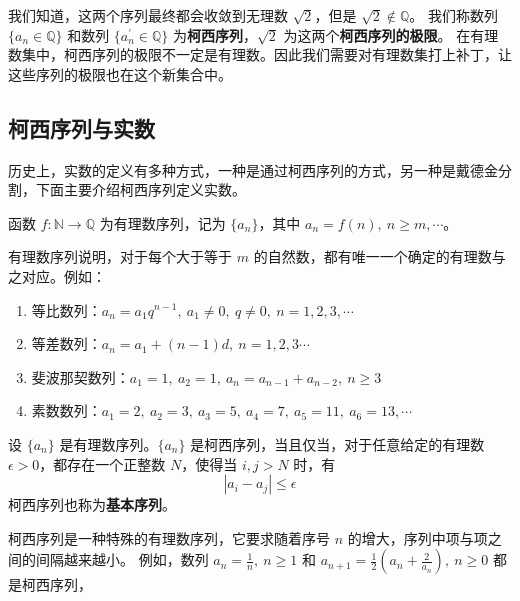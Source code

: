 \begin{note}
    我们知道，这两个序列最终都会收敛到无理数 $ \sqrt{2} $，但是 $ \sqrt{2}\notin\mathbb{Q} $。
    我们称数列 $ \{a_n\in\mathbb{Q}\} $ 和数列 $ \{a_n^{\prime}\in\mathbb{Q}\} $ 为\textbf{柯西序列}，$ \sqrt{2} $ 为这两个\textbf{柯西序列的极限}。
    在有理数集中，柯西序列的极限不一定是有理数。因此我们需要对有理数集打上补丁，让这些序列的极限也在这个新集合中。
\end{note}
\vspace{1em}

\subsection{柯西序列与实数}

历史上，实数的定义有多种方式，一种是通过柯西序列的方式，另一种是戴德金分割，下面主要介绍柯西序列定义实数。
\vspace{1em}

\begin{definition}
    函数 $f:\mathbb{N}\to\mathbb{Q}$ 为有理数序列，记为 $\{a_n\}$，其中 $a_n=f(n),\ n\ge m,\cdots$。
\end{definition}
\begin{note}
    有理数序列说明，对于每个大于等于 $m$ 的自然数，都有唯一一个确定的有理数与之对应。例如：
    \begin{enumerate}
        \item 等比数列：$a_n = a_1q^{n-1},\ a_1\neq 0,\ q\neq 0,\ n=1,2,3,\cdots$
        \item 等差数列：$a_n = a_1 + (n-1)d,\ n=1,2,3\cdots$
        \item 斐波那契数列：$a_1=1,\ a_2=1,\ a_n=a_{n-1}+a_{n-2},\ n\ge 3$
        \item 素数数列：$a_1=2,\ a_2=3,\ a_3=5,\ a_4=7,\ a_5=11,\ a_6=13,\cdots$
    \end{enumerate}
\end{note}
\vspace{1em}

\begin{definition}
    设 $\{a_n\}$ 是有理数序列。$\{a_n\}$ 是柯西序列，当且仅当，对于任意给定的有理数 $\epsilon>0$，都存在一个正整数 $N$，使得当 $i,j>N$ 时，有
    \[
        |a_i - a_j| \le \epsilon
    \]
    柯西序列也称为\textbf{基本序列}。
\end{definition}
\begin{note}
    柯西序列是一种特殊的有理数序列，它要求随着序号 $n$ 的增大，序列中项与项之间的间隔越来越小。
    例如，数列 $a_n = \frac{1}{n},\ n\ge 1$ 和 $a_{n+1} = \frac{1}{2}(a_n+\frac{2}{a_n}),\ n\ge 0$ 都是柯西序列，
\end{note}
\vspace{1em}

